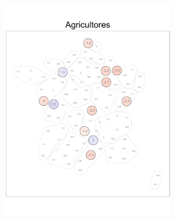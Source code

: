\begin{figure}
	\centering
	\begin{subfigure}{0.235\textwidth}
	\includegraphics[width = \textwidth]{Figs/Efectos/Dorling_Efectos_CSP1_Modelo_H}
	\end{subfigure}
	~
	\begin{subfigure}{0.235\textwidth}

\end{subfigure}
\end{figure}
